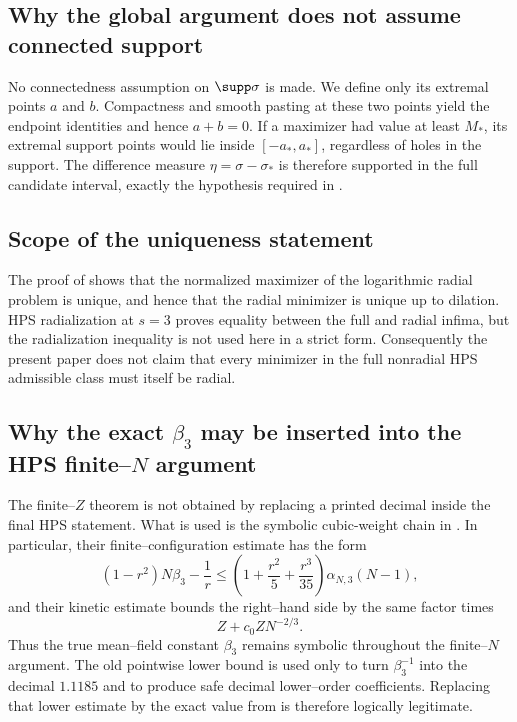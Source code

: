 \subsection{Why the global argument does not assume connected support}

No connectedness assumption on $\supp\sigma$ is made.  We define only its extremal points $a$ and $b$.  Compactness and smooth pasting at these two points yield the endpoint identities and hence $a+b=0$.  If a maximizer had value at least $M_*$, its extremal support points would lie inside $[-a_*,a_*]$, regardless of holes in the support.  The difference measure $\eta=\sigma-\sigma_*$ is therefore supported in the full candidate interval, exactly the hypothesis required in .

\subsection{Scope of the uniqueness statement}

The proof of  shows that the normalized maximizer of the logarithmic radial problem is unique, and hence that the radial minimizer is unique up to dilation.  HPS radialization at $s=3$ proves equality between the full and radial infima, but the radialization inequality is not used here in a strict form.  Consequently the present paper does not claim that every minimizer in the full nonradial HPS admissible class must itself be radial.

\subsection{Why the exact $\beta_3$ may be inserted into the HPS finite--$N$ argument}

The finite--$Z$ theorem is not obtained by replacing a printed decimal inside the final HPS statement.  What is used is the symbolic cubic-weight chain in \cite[Sec.~7.3]{HPS2025}.  In particular, their finite--configuration estimate has the form
\[
 (1-r^2)N\beta_3-\frac1r
 \le
 \left(1+\frac{r^2}{5}+\frac{r^3}{35}\right)\alpha_{N,3}(N-1),
\]
and their kinetic estimate bounds the right--hand side by the same factor times
\[
 Z+c_0ZN^{-2/3}.
\]
Thus the true mean--field constant $\beta_3$ remains symbolic throughout the finite--$N$ argument.  The old pointwise lower bound is used only to turn $\beta_3^{-1}$ into the decimal $1.1185$ and to produce safe decimal lower--order coefficients.  Replacing that lower estimate by the exact value from  is therefore logically legitimate.

